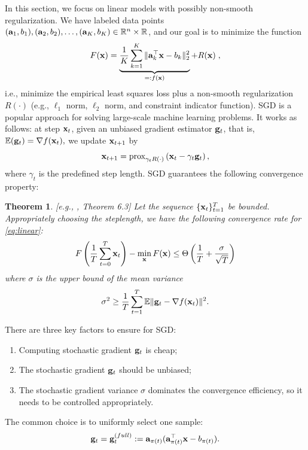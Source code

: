 \documentclass{article}
\newcommand{\R}{\mathbb{R}}
\def\a{{\bf a}}
\def\g{{\bf g}}
\def\x{{\bf x}}
\def\E{\mathbb{E}}
\newtheorem{theorem}{Theorem}
\begin{document}
In this section, we focus on linear models with possibly non-smooth regularization. We have labeled data points $(\a_1, b_1), (\a_2, b_2), \ldots, (\a_K, b_K) \in \R^n \times \R$, and our goal is to minimize the function
\begin{align}
F(\x) = \underbrace{\frac{1}{K} \sum_{k = 1}^K \| \a_k^\top \x - b_k \|_2^2}_{=: f(\x)} + R(\x) \; ,
\label{eq:linear}
\end{align}
i.e., minimize the empirical least squares loss plus a non-smooth regularization $R(\cdot)$ (e.g., $\ell_1$ norm, $\ell_2$ norm, and constraint indicator function). SGD is a popular approach for solving large-scale machine learning problems. It works as follows: at step $\x_t$, given an unbiased gradient estimator $\g_t$, that is, 
$\E(\g_t) = \nabla f(\x_t),$
we update $\x_{t+1}$ by
\[
\x_{t+1} = \text{prox}_{\gamma_t R(\cdot)}\left( \x_t - \gamma_t \g_t\right),
\]
where $\gamma_t$ is the predefined step length. SGD guarantees the following convergence property:
\begin{theorem}\label{thm:sgd-conv}[e.g., \cite{2014arXiv1405.4980B}, Theorem 6.3]
Let the sequence $\{\x_t\}_{t=1}^T$ be bounded. Appropriately choosing the steplength,
we have the following convergence rate for \eqref{eq:linear}:
% 
\begin{equation}
F\left(\frac{1}{T} \sum_{t = 0}^T \x_t\right) - \min_{\x}F(\x) \leq \Theta\left({1\over T} + {\sigma \over \sqrt{T}}\right) 
\label{eq:sgd-conv}
\end{equation}
where $\sigma$ is the upper bound of the mean variance 
\[
\sigma^2 \geq {1\over T}\sum_{t=1}^T \E\|\g_t - \nabla f(\x_t)\|^2. 
\]
\end{theorem} 
There are three key factors to ensure for SGD:
\begin{enumerate}[leftmargin=*, noitemsep]
\item Computing stochastic gradient $\g_t$ is cheap;
\item The stochastic gradient $\g_t$ should be unbiased;
\item The stochastic gradient variance $\sigma$ dominates the convergence efficiency, so it needs to be controlled appropriately.
\end{enumerate}
The common choice is to uniformly select one sample:
\begin{align}
\g_t = \g_t^{(full)} := \a_{\pi(t)} (\a_{\pi(t)}^\top \x - b_{\pi(t)}).
\label{eq:sgfull}
\end{align} 
\end{document}
